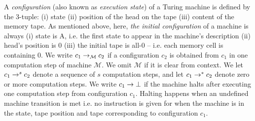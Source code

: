 A \textit{configuration} (also known as \textit{execution state}) of a Turing machine is defined by the 3-tuple: (i) state (ii) position of the head on the tape (iii) content of the memory tape. As mentioned above, here, \textit{the initial configuration} of a machine is always (i) state is A, i.e. the first state to appear in the machine's description (ii) head's position is 0 (iii) the initial tape is all-0 -- i.e. each memory cell is containing 0. We write $c_1 \to_\mathcal{M} c_2$ if a configuration $c_2$ is obtained from $c_1$ in one computation step of machine $\mathcal{M}$. We omit $\mathcal{M}$ if it is clear from context. We let $c_1 \to^s c_2$ denote a sequence of $s$ computation steps, and let $c_1 \to^* c_2$ denote zero or more computation steps. %
We write $c_1 \to \bot$ if the machine halts after executing one computation step from configuration $c_1$. Halting happens when an undefined machine transition is met i.e. no instruction is given for when the machine is in the state, tape position and tape corresponding to configuration $c_1$.




